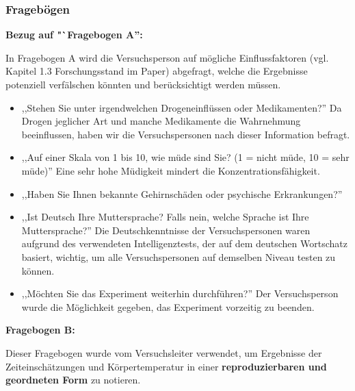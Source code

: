 \documentclass{Bericht}
\begin{document}
\subsubsection{Fragebögen}
\label{subsec:fragebogen}
\textbf{Bezug auf "`Fragebogen A'':}

In Fragebogen A wird die Versuchsperson auf mögliche Einflussfaktoren (vgl. Kapitel 1.3 Forschungsstand im Paper) abgefragt, welche die Ergebnisse potenziell verfälschen könnten und berücksichtigt werden müssen. 

\begin{itemize}
	\setlength{\itemsep}{0em}
	\item ,,Stehen Sie unter irgendwelchen Drogeneinflüssen oder Medikamenten?''
Da Drogen jeglicher Art und manche Medikamente die Wahrnehmung beeinflussen, haben wir die Versuchspersonen nach dieser Information befragt.
	\item ,,Auf einer Skala von 1 bis 10, wie müde sind Sie? (1 = nicht müde, 10 = sehr müde)''
Eine sehr hohe Müdigkeit mindert die Konzentrationsfähigkeit.
	\item ,,Haben Sie Ihnen bekannte Gehirnschäden oder psychische Erkrankungen?''

	\item ,,Ist Deutsch Ihre Muttersprache? Falls nein, welche Sprache ist Ihre Muttersprache?''
Die Deutschkenntnisse der Versuchspersonen waren aufgrund des verwendeten Intelligenztests, der auf dem deutschen Wortschatz basiert, wichtig, um alle Versuchspersonen auf demselben Niveau testen zu können.
	\item ,,Möchten Sie das Experiment weiterhin durchführen?''
Der Versuchsperson wurde die Möglichkeit gegeben, das Experiment vorzeitig zu beenden.
\end{itemize}

\textbf{Fragebogen B:}

Dieser Fragebogen wurde vom Versuchsleiter verwendet, um Ergebnisse der Zeiteinschätzungen und Körpertemperatur in einer \textbf{reproduzierbaren und geordneten Form} zu notieren. 

\end{document}
